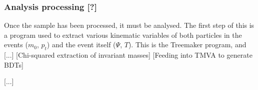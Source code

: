 \subsubsection{Analysis processing [?]}
Once the sample has been processed, it must be analysed. The first step of this is a program used to extract various kinematic variables of both particles in the events ($m_0$, $p_t$) and the event itself ($\Psi$, $T$). This is the Treemaker program, and [...] [Chi-squared extraction of invariant masses] [Feeding into TMVA to generate BDTs]

[...]




%

